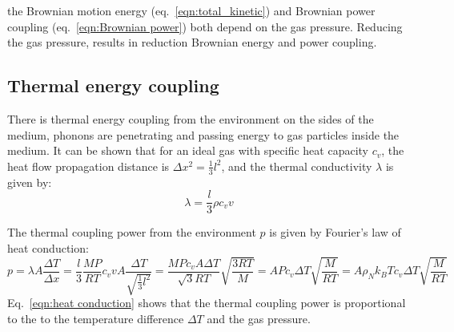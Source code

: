 \documentclass[\main/master.tex]{subfiles}
\begin{document}
\par\noindent
the Brownian motion energy (eq.~\ref{eqn:total_kinetic}) and Brownian power coupling (eq.~\ref{eqn:Brownian power}) both depend on the gas pressure. Reducing the gas pressure, results in reduction Brownian energy and power coupling. 
\iffalse
\subsection{Thermal energy coupling}
There is thermal energy coupling from the environment on the sides of the medium, phonons are penetrating and passing energy to gas particles inside the medium. It can be shown that for an ideal gas with specific heat capacity $c_v$, the heat flow propagation distance is $\Delta x ^2  = \frac{1}{3} l^2 $, and the thermal conductivity $\lambda$ is given by:
\begin{equation}
\lambda  = \frac{l}{3}\rho c_v v    \label{eqn:heat conduction coefficient}
\end{equation}

The thermal coupling power from the environment $p$ is given by Fourier's law of heat conduction:
\begin{equation}
p =  \lambda A \frac{\Delta T}{\Delta x} =\frac{l}{3} \frac{MP}{RT} c_v v A \frac{\Delta T}{\sqrt{\frac{1}{3} l^2 }} = \frac{M P c_v  A \Delta T}{\sqrt{3}RT} \sqrt{\frac{3RT}{M}} =    A P c_v \Delta T \sqrt{\frac{M}{RT}}   = A \rho_N k_B T c_v \Delta T \sqrt{\frac{M}{RT}}
\label{eqn:heat conduction}
\end{equation}
Eq.~\ref{eqn:heat conduction} shows that the thermal coupling power is proportional to the to the temperature difference $\Delta T$ and the gas pressure.
\end{document}
